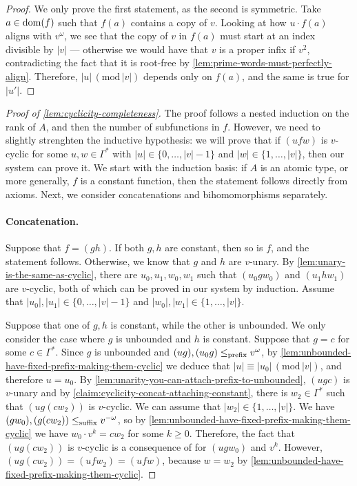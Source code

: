 \begin{proof}
    We only prove the first statement, as the second is symmetric. Take $a \in \operatorname{\mathrm{dom}}(f)$ such that $f(a)$ contains a copy of $v$. Looking at how $u \cdot f(a)$ aligns with $v^\omega$, we see that the copy of $v$ in $f(a)$ must start at an index divisible by $|v|$ --- otherwise we would have that $v$ is a proper infix if $v^2$, contradicting the fact that it is root-free by \cref{lem:prime-words-must-perfectly-align}. Therefore, $|u| \, (\mathrm{mod} \, |v|)$ depends only on $f(a)$, and the same is true for $|u'|$.
\end{proof}

\begin{proof}[Proof of \cref{lem:cyclicity-completeness}]
    The proof follows a nested induction on the rank of $A$, and then the number of subfunctions in $f$. However, we need to slightly strenghten the inductive hypothesis: we will prove that if $(u f w)$ is $v$-cyclic for some $u, w \in \Gamma^*$ with $|u| \in \{0, \dots, |v|-1\}$ and $|w| \in \{1, \dots, |v| \}$, then our system can prove it. We start with the induction basis: if $A$ is an atomic type, or more generally, $f$ is a constant function, then the statement follows directly from axioms. Next, we consider concatenations and bihomomorphisms separately.

    \paragraph{Concatenation.} Suppose that $f = (g h)$. If both $g,h$ are constant, then so is $f$, and the statement follows. Otherwise, we know that $g$ and $h$ are $v$-unary. By \cref{lem:unary-is-the-same-as-cyclic}, there are $u_0,u_1,w_0,w_1$ such that $(u_0 g w_0)$ and $(u_1 h w_1)$ are $v$-cyclic, both of which can be proved in our system by induction. Assume that $|u_0|, |u_1| \in \{0, \dots, |v|-1\}$ and $|w_0|, |w_1| \in \{1, \dots, |v| \}$. 

    Suppose that one of $g,h$ is constant, while the other is unbounded. We only consider the case where $g$ is unbounded and $h$ is constant. Suppose that $g = c$ for some $c \in \Gamma^*$. Since $g$ is unbounded and $(u g), (u_0 g) \leq_{\mathrm{prefix}} v^\omega$, by \cref{lem:unbounded-have-fixed-prefix-making-them-cyclic} we deduce that $|u| \equiv |u_0| \, (\mathrm{mod} \, |v|)$, and therefore $u = u_0$. By \cref{lem:unarity-you-can-attach-prefix-to-unbounded}, $(u g c)$ is $v$-unary and by \cref{claim:cyclicity-concat-attaching-constant}, there is $w_2 \in \Gamma^*$ such that $(u g (c w_2))$ is $v$-cyclic. We can assume that $|w_2| \in \{1, \dots, |v| \}$. We have $(g w_0), (g (c w_2)) \leq_{\mathrm{suffix}} v^{-\omega}$, so by \cref{lem:unbounded-have-fixed-prefix-making-them-cyclic} we have $w_0 \cdot v^k = c w_2$ for some $k \geq 0$. Therefore, the fact that $(u g (c w_2))$ is $v$-cyclic is a consequence of  for $(u g w_0)$ and $v^k$. However, $(u g (c w_2)) = (u f w_2) = (u f w)$, because $w = w_2$ by \cref{lem:unbounded-have-fixed-prefix-making-them-cyclic}. 


\end{proof}

